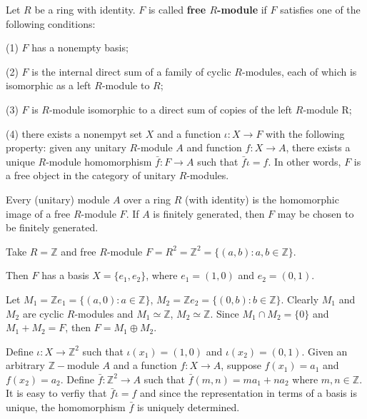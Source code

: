 \documentclass{article}
\begin{document}
\begin{theorem}
    Let $R$ be a ring with identity. $F$ is called \textbf{free $R$-module} if $F$ satisfies one of the following conditions:

    (1) $F$ has a nonempty basis;

    (2) $F$ is the internal direct sum of a family of cyclic $R$-modules, each of which is isomorphic as a left $R$-module to $R$;

    (3) $F$ is $R$-module isomorphic to a direct sum of copies of the left $R$-module R;

    (4) there exists a nonempyt set $X$ and a function $\iota:X \to F$ with the following property: given any unitary $R$-module $A$ and function $f:X\to A$, there exists a unique $R$-module homomorphism $\bar{f}:F\to A$ such that $\bar{f}\iota=f$. In other words, $F$ is a free object in the category of unitary $R$-modules.
\end{theorem}

\begin{corollary}
    Every (unitary) module $A$ over a ring $R$ (with identity) is the homomorphic image of a free $R$-module $F$. If $A$ is finitely generated, then $F$ may be chosen to be finitely generated.
\end{corollary}

\begin{example}
    Take $R=\mathbb{Z}$ and free $R$-module $F=R^2=\mathbb{Z}^2=\{(a,b): a,b \in \mathbb{Z}\}$. 
    
    Then $F$ has a basis $X=\{e_{1},e_{2}\}$, where $e_{1}=(1,0)$ and $e_{2}=(0,1)$. 
    
    Let $M_{1}=\mathbb{Z}e_{1}=\{(a,0):a \in \mathbb{Z}\}$, $M_{2}=\mathbb{Z}e_{2}=\{(0,b):b \in \mathbb{Z}\}$. Clearly $M_{1}$ and $M_{2}$ are cyclic $R$-modules and $M_{1} \simeq \mathbb{Z}$, $M_{2} \simeq \mathbb{Z}$. Since $M_{1}\cap M_{2}=\{0\}$ and $M_{1}+M_{2}=F$, then $F=M_{1}\oplus M_{2}$.

    Define $\iota: X \to \mathbb{Z}^2$ such that $\iota(x_{1})=(1,0)$ and $\iota(x_{2})=(0,1)$. Given an arbitrary $\mathbb{Z}-$module $A$ and a function $f:X \to A$, suppose $f(x_{1})=a_{1}$ and $f(x_{2})=a_{2}$. Define $\bar{f}:\mathbb{Z}^2\to A$ such that $\bar{f}(m,n)=ma_{1}+na_{2}$ where $m,n \in \mathbb{Z}$. It is easy to verfiy that $\bar{f}\iota=f$ and since the representation in terms of a basis is unique, the homomorphism $\bar{f}$ is uniquely determined.
\end{example}
\end{document}
